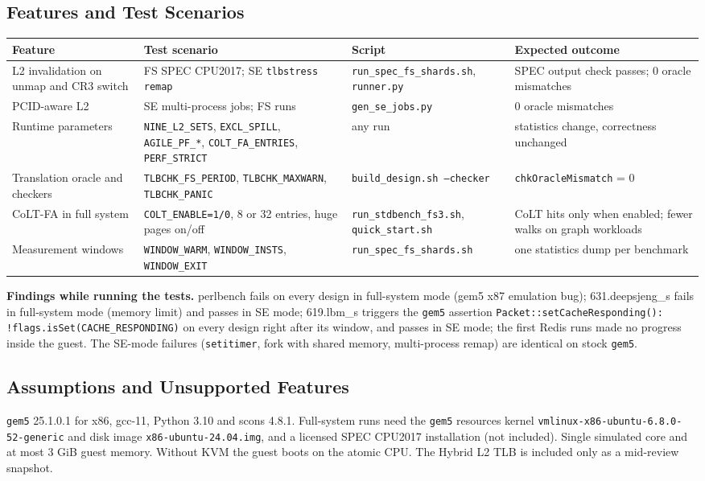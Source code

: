 \subsection{Features and Test Scenarios}
\begin{table}[H]
\centering
\small
\begin{tabularx}{\textwidth}{l X X X}
\toprule
\textbf{Feature} & \textbf{Test scenario} & \textbf{Script} & \textbf{Expected outcome} \\
\midrule
L2 invalidation on unmap and CR3 switch & FS SPEC CPU2017; SE \texttt{tlbstress remap} & \texttt{run\_spec\_fs\_shards.sh}, \texttt{runner.py} & SPEC output check passes; 0 oracle mismatches \\
PCID-aware L2 & SE multi-process jobs; FS runs & \texttt{gen\_se\_jobs.py} & 0 oracle mismatches \\
Runtime parameters & \texttt{NINE\_L2\_SETS}, \texttt{EXCL\_SPILL}, \texttt{AGILE\_PF\_*}, \texttt{COLT\_FA\_ENTRIES}, \texttt{PERF\_STRICT} & any run & statistics change, correctness unchanged \\
Translation oracle and checkers & \texttt{TLBCHK\_FS\_PERIOD}, \texttt{TLBCHK\_MAXWARN}, \texttt{TLBCHK\_PANIC} & \texttt{build\_design.sh --checker} & \texttt{chkOracleMismatch} = 0 \\
CoLT-FA in full system & \texttt{COLT\_ENABLE=1/0}, 8 or 32 entries, huge pages on/off & \texttt{run\_stdbench\_fs3.sh}, \texttt{quick\_start.sh} & CoLT hits only when enabled; fewer walks on graph workloads \\
Measurement windows & \texttt{WINDOW\_WARM}, \texttt{WINDOW\_INSTS}, \texttt{WINDOW\_EXIT} & \texttt{run\_spec\_fs\_shards.sh} & one statistics dump per benchmark \\
\bottomrule
\end{tabularx}
\end{table}

\noindent \textbf{Findings while running the tests.} perlbench fails on every design in full-system mode (gem5 x87 emulation bug); 631.deepsjeng\_s fails in full-system mode (memory limit) and passes in SE mode; 619.lbm\_s triggers the \texttt{gem5} assertion \texttt{Packet::setCacheResponding(): !flags.isSet(CACHE\_RESPONDING)} on every design right after its window, and passes in SE mode; the first Redis runs made no progress inside the guest. The SE-mode failures (\texttt{setitimer}, fork with shared memory, multi-process remap) are identical on stock \texttt{gem5}.

\subsection{Assumptions and Unsupported Features}
\texttt{gem5} 25.1.0.1 for x86, gcc-11, Python 3.10 and scons 4.8.1. Full-system runs need the \texttt{gem5} resources kernel \texttt{vmlinux-x86-ubuntu-6.8.0-52-generic} and disk image \texttt{x86-ubuntu-24.04.img}, and a licensed SPEC CPU2017 installation (not included). Single simulated core and at most 3 GiB guest memory. Without KVM the guest boots on the atomic CPU. The Hybrid L2 TLB is included only as a mid-review snapshot.

